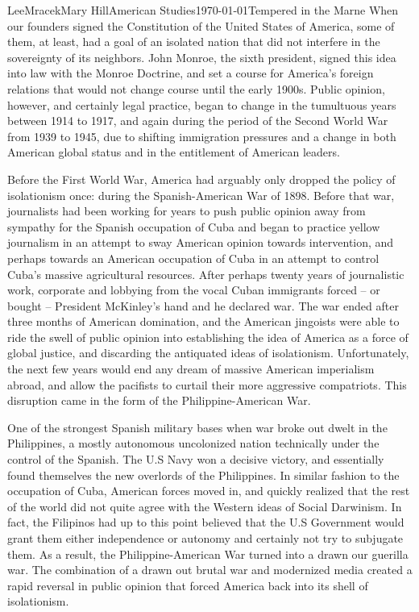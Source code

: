 \documentclass{article}
\begin{document}
\begin{mla}{Lee}{Mracek}{Mary Hill}{American Studies}{\today}{Tempered in the Marne}
    When our founders signed the Constitution of the United States of America, some of them, at least, had a goal of an isolated nation that did not interfere in the sovereignty of its neighbors. John Monroe, the sixth president, signed this idea into law with the Monroe Doctrine, and set a course for America's foreign relations that would not change course until the early 1900s. Public opinion, however, and certainly legal practice, began to change in the tumultuous years between 1914 to 1917, and again during the period of the Second World War from 1939 to 1945, due to shifting immigration pressures and a change in both American global status and in the entitlement of American leaders.
    
    Before the First World War, America had arguably only dropped the policy of isolationism once: during the Spanish-American War of 1898. Before that war, journalists had been working for years to push public opinion away from sympathy for the Spanish occupation of Cuba and began to practice yellow journalism in an attempt to sway American opinion towards intervention, and perhaps towards an American occupation of Cuba in an attempt to control Cuba's massive agricultural resources. After perhaps twenty years of journalistic work, corporate and lobbying from the vocal Cuban immigrants forced -- or bought -- President McKinley's hand and he declared war. The war ended after three months of American domination, and the American jingoists were able to ride the swell of public opinion into establishing the idea of America as a force of global justice, and discarding the antiquated ideas of isolationism. Unfortunately, the next few years would end any dream of massive American imperialism abroad, and allow the pacifists to curtail their more aggressive compatriots. This disruption came in the form of the Philippine-American War.

    One of the strongest Spanish military bases when war broke out dwelt in the Philippines, a mostly autonomous uncolonized nation technically under the control of the Spanish. The U.S Navy won a decisive victory, and essentially found themselves the new overlords of the Philippines. In similar fashion to the occupation of Cuba, American forces moved in, and quickly realized that the rest of the world did not quite agree with the Western ideas of Social Darwinism. In fact, the Filipinos had up to this point believed that the U.S Government would grant them either independence or autonomy and certainly not try to subjugate them. As a result, the Philippine-American War turned into a drawn our guerilla war. The combination of a drawn out brutal war and modernized media created a rapid reversal in public opinion that forced America back into its shell of isolationism.


\end{mla}
\end{document}
